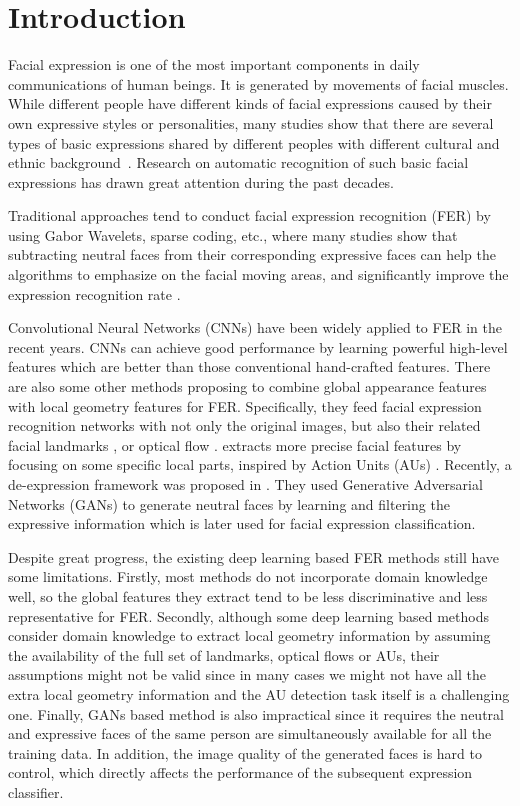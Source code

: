 \documentclass[conference,a4paper]{IEEEtran}
\begin{document}
\section{Introduction}

Facial expression is one of the most important components in daily communications of human beings. It is generated by movements of facial muscles. While different people have different kinds of facial expressions caused by their own expressive styles or personalities, many studies show that there are several types of basic expressions shared by different peoples with different cultural and ethnic background~\cite{fasel2003automatic}. Research on automatic recognition of such basic facial expressions has drawn great attention during the past decades. 

Traditional approaches tend to conduct facial expression recognition (FER) by using Gabor Wavelets, sparse coding, etc., where many studies show that subtracting neutral faces from their corresponding expressive faces can help the algorithms to emphasize on the facial moving areas, and significantly improve the expression recognition rate \cite{bazzo2004recognizing}.

Convolutional Neural Networks (CNNs) have been widely applied to FER in the recent years. CNNs can achieve good performance by learning powerful high-level features which are better than those conventional hand-crafted features. There are also some other methods proposing to combine global appearance features with local geometry features for FER. Specifically, they feed facial expression recognition networks with not only the original images, but also their related facial landmarks \cite{jung2015joint}, or optical flow \cite{sun2017deep}. \cite{liu2015inspired} extracts more precise facial features by focusing on some specific local parts, inspired by Action Units (AUs) \cite{shao2018deep, shao2018facial}. Recently, a de-expression framework was proposed in \cite{yang2018facial}. They used Generative Adversarial Networks (GANs) to generate neutral faces by learning and filtering the expressive information which is later used for facial expression classification.



Despite great progress, the existing deep learning based FER methods still have some limitations. 
Firstly, most methods do not incorporate domain knowledge well, so the global features they extract tend to be less discriminative and less representative for FER. Secondly, although some deep learning based methods consider domain knowledge to extract local geometry information by assuming the availability of the full set of landmarks, optical flows or AUs, their assumptions might not be valid since in many cases we might not have all the extra local geometry information and the AU detection task itself is a challenging one. Finally, GANs based method is also impractical since it requires the neutral and expressive faces of the same person are simultaneously available for all the training data. In addition, the image quality of the generated faces is hard to control, which directly affects the performance of the subsequent expression classifier.  
\end{document}
